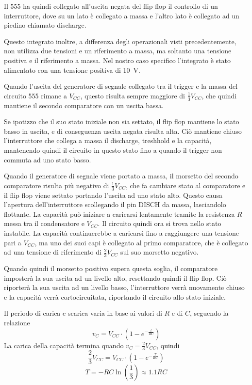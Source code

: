 Il 555 ha quindi collegato all'uscita negata del flip flop il controllo di un interruttore, dove su un lato è collegato a massa e l'altro lato è collegato ad un piedino chiamato discharge.

\noindent
Questo integrato inoltre, a differenza degli operazionali visti precedentemente, non utilizza due tensioni e un riferimento a massa, ma soltanto una tensione positiva e il riferimento a massa. Nel nostro caso specifico l'integrato è stato alimentato con una tensione positiva di \SI{10}{\volt}.

\noindent
Quando l'uscita del generatore di segnale collegato tra il trigger e la massa del circuito 555 rimane a $V_{CC}$, questo risulta sempre maggiore di $\frac{1}{3}V_{CC}$, che quindi mantiene il secondo comparatore con un uscita bassa.

\noindent
Se ipotizzo che il suo stato iniziale non sia settato, il flip flop mantiene lo stato basso in uscita, e di conseguenza uscita negata risulta alta. Ciò mantiene chiuso l'interruttore che collega a massa il discharge, treshhold e la capacità, mantenendo quindi il circuito in questo stato fino a quando il trigger non commuta ad uno stato basso.

\noindent
Quando il generatore di segnale viene portato a massa, il morsetto del secondo comparatore risulta più negativo di $\frac{1}{3}V_{CC}$, che fa cambiare stato al comparatore e il flip flop viene settato portando l'uscita ad uno stato alto. Questo causa l'apertura dell'interruttore scollegando il pin DISCH da massa, lasciandolo flottante.
La capacità può iniziare a caricarsi lentamente tramite la resistenza $R$ messa tra il condensatore e $V_{CC}$. Il circuito quindi ora si trova nello stato instabile. La capacità continuerebbe a caricarsi fino a raggiungere una tensione pari a $V_{CC}$, ma uno dei suoi capi è collegato al primo comparatore, che è collegato ad una tensione di riferimento di $\frac{2}{3}V_{CC}$ sul suo morsetto negativo. 

\noindent
Quando quindi il morsetto positivo supera questa soglia, il comparatore imposterà la sua uscita ad un livello alto, resettando quindi il flip flop. Ciò riporterà la sua uscita ad un livello basso, l'interruttore verrà nuovamente chiuso e la capacità verrà cortocircuitata, riportando il circuito allo stato iniziale.

\noindent
Il periodo di carica e scarica varia in base ai valori di $R$ e di $C$, seguendo la relazione
\[v_C = V_{CC}\cdot\left(1-e^{-\frac{t}{RC}}\right)\]
La carica della capacità termina quando $v_C = \frac{2}{3}V_{CC}$, quindi
\[\frac{2}{3}V_{CC} = V_{CC}\cdot\left(1-e^{-\frac{T}{RC}}\right)\]
\[T=-RC\ln\left(\frac{1}{3}\right)\approx1.1RC\]

